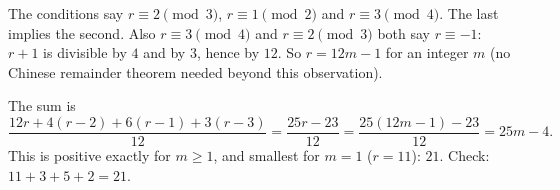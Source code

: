 The conditions say $r\equiv2\pmod3$, $r\equiv1\pmod2$ and $r\equiv3\pmod4$. The last implies the second. Also $r\equiv3\pmod4$ and $r\equiv2\pmod3$ both say $r\equiv-1$: $r+1$ is divisible by $4$ and by $3$, hence by $12$. So $r=12m-1$ for an integer $m$ (no Chinese remainder theorem needed beyond this observation).

The sum is
\[
\dfrac{12r+4(r-2)+6(r-1)+3(r-3)}{12}=\dfrac{25r-23}{12}=\dfrac{25(12m-1)-23}{12}=25m-4 .
\]
This is positive exactly for $m\ge1$, and smallest for $m=1$ ($r=11$): $\boxed{21}$. Check: $11+3+5+2=21$.

